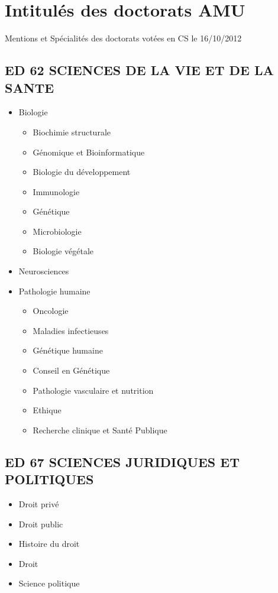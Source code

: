 \section{Intitulés des doctorats AMU}

Mentions et Spécialités des doctorats votées en CS le 16/10/2012

\subsection*{ED 62 SCIENCES DE LA VIE ET DE LA SANTE}\label{ed-62-sciences-de-la-vie-et-de-la-sante}

\begin{itemize}
\item Biologie
\begin{itemize}
\item Biochimie structurale
\item Génomique et Bioinformatique
\item Biologie du développement
\item Immunologie
\item Génétique
\item Microbiologie\
\item Biologie végétale
\end{itemize}
\item Neurosciences
\item Pathologie humaine
\begin{itemize}
\item Oncologie
\item Maladies infectieuses
\item Génétique humaine
\item Conseil en Génétique
\item Pathologie vasculaire et nutrition
\item Ethique
\item Recherche clinique et Santé Publique
\end{itemize}
\end{itemize}

\subsection*{ED 67 SCIENCES JURIDIQUES ET POLITIQUES}\label{ed-67-sciences-juridiques-et-politiques}

\begin{itemize}
\item Droit privé
\item Droit public
\item Histoire du droit
\item Droit
\item Science politique
\end{itemize}

